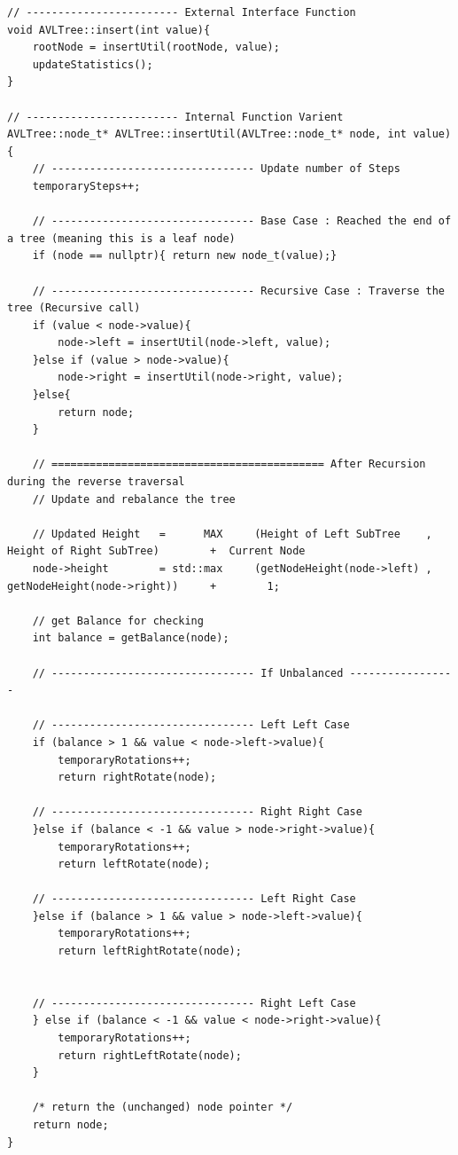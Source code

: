 \documentclass[12pt, a4paper]{report}
\begin{document}
\begin{verbatim}
// ------------------------ External Interface Function
void AVLTree::insert(int value){
    rootNode = insertUtil(rootNode, value);
    updateStatistics();
}

// ------------------------ Internal Function Varient
AVLTree::node_t* AVLTree::insertUtil(AVLTree::node_t* node, int value){
    // -------------------------------- Update number of Steps
    temporarySteps++;

    // -------------------------------- Base Case : Reached the end of a tree (meaning this is a leaf node)
    if (node == nullptr){ return new node_t(value);}  
  
    // -------------------------------- Recursive Case : Traverse the tree (Recursive call)
    if (value < node->value){
        node->left = insertUtil(node->left, value);  
    }else if (value > node->value){
        node->right = insertUtil(node->right, value);
    }else{
        return node;
    }
    
    // =========================================== After Recursion during the reverse traversal
    // Update and rebalance the tree

    // Updated Height   =      MAX     (Height of Left SubTree    ,  Height of Right SubTree)        +  Current Node
    node->height        = std::max     (getNodeHeight(node->left) ,  getNodeHeight(node->right))     +        1;  
  
    // get Balance for checking
    int balance = getBalance(node);  
  
    // -------------------------------- If Unbalanced -----------------
      
    // -------------------------------- Left Left Case  
    if (balance > 1 && value < node->left->value){ 
        temporaryRotations++;
        return rightRotate(node);  
        
    // -------------------------------- Right Right Case  
    }else if (balance < -1 && value > node->right->value){
        temporaryRotations++;
        return leftRotate(node);  
    
    // -------------------------------- Left Right Case
    }else if (balance > 1 && value > node->left->value){  
        temporaryRotations++;
        return leftRightRotate(node);
        
        
    // -------------------------------- Right Left Case  
    } else if (balance < -1 && value < node->right->value){  
        temporaryRotations++;
        return rightLeftRotate(node);
    }  
  
    /* return the (unchanged) node pointer */
    return node;  
}  
\end{verbatim}
\end{document}
